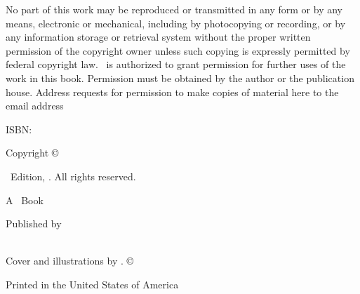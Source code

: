 \singlespacing
\thispagestyle{empty}
\null
\vfill
{\parindent0pt
No part of this work may be reproduced or transmitted in any form or by any means, electronic or mechanical, including by photocopying or recording, or by any information storage or retrieval system without the proper written permission of the copyright owner unless such copying is expressly permitted by federal copyright law. \Publisher\ is authorized to grant permission for further uses of the work in this book. Permission must be obtained by the author or the publication house. Address requests for permission to make copies of material here to the email address \PublisherEmail

\vspace{1ex}

ISBN: \ISBN

\vspace{1ex}

\textsc{\FullTitle}

\vspace{1ex}

Copyright \copyright\ \Year\ \Publisher

\vspace{1ex}

\Edition\ Edition, \Year. All rights reserved.

\vspace{1ex}

A \Publisher\ Book

\vspace{1ex}

Published by \Publisher\\
\PublisherURL\\
\PublisherLocation

\vspace{1ex}

\PublisherEmail

\vspace{1ex}

Cover and illustrations by \Illustrator. \copyright\ \Year

\vspace{1ex}

Printed in the United States of America\\
\EditionsList
}%

\clearpage
